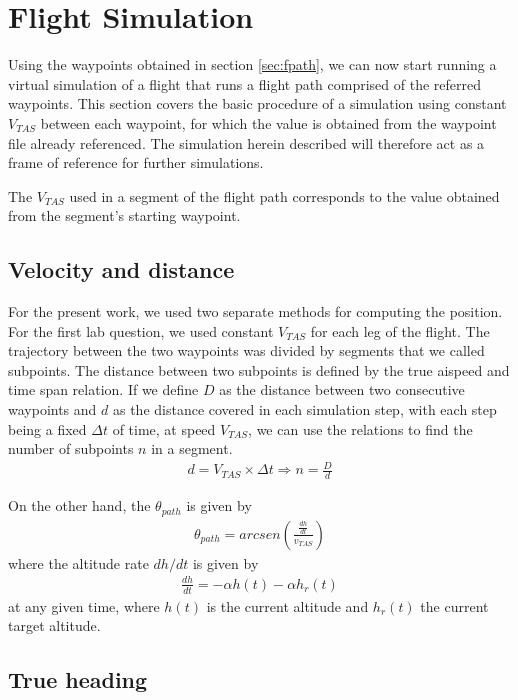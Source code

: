 \documentclass{article}
\begin{document}
\section{Flight Simulation} \label{sec:flightsim_basic}

Using the waypoints obtained in section \ref{sec:fpath}, we can now start running a virtual simulation of a flight that runs a flight path comprised of the referred waypoints. This section covers the basic procedure of a simulation using constant $V_{TAS}$ between each waypoint, for which the value is obtained from the waypoint file already referenced. The simulation herein described will therefore act as a frame of reference for further simulations.

The $V_{TAS}$ used in a segment of the flight path corresponds to the value obtained from the segment's starting waypoint.

\subsection{Velocity and distance}

For the present work, we used two separate methods for computing the position. For the first lab question, we used constant $V_{TAS}$ for each leg of the flight. The trajectory between the two waypoints was divided by segments that we called subpoints. The distance between two subpoints is defined by the true aispeed and time span relation. If we define $D$ as the distance between two consecutive waypoints and $d$ as the distance covered in each simulation step, with each step being a fixed $\Delta t$ of time, at speed $V_{TAS}$, we can use the relations to find the number of subpoints $n$ in a segment.
\begin{gather*}
    d = V_{TAS} \times \Delta t \Rightarrow n = \frac{D}{d}
\end{gather*}

On the other hand, the $\theta_{path}$ is given by
\begin{gather*}
    \theta_{path} = arcsen\left(\frac{\frac{dh}{dt}}{v_{TAS}}\right)
\end{gather*}
where the altitude rate $dh/dt$ is given by
\begin{gather*}
    \frac{dh}{dt}=-\alpha h(t) - \alpha h_r(t)
\end{gather*}
at any given time, where $h(t)$ is the current altitude and $h_r(t)$ the current target altitude.

\subsection{True heading} \label{sec:theading}
\end{document}
